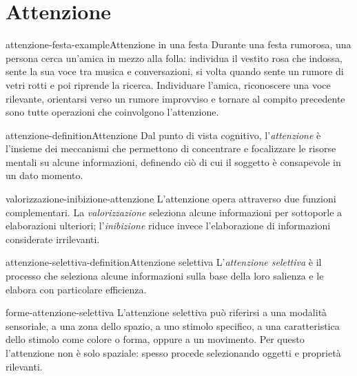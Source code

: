 \documentclass[preview]{standalone}
\begin{document}
\genpage

\section{Attenzione}

\begin{snippetexample}{attenzione-festa-example}{Attenzione in una festa}
    Durante una festa rumorosa, una persona cerca un'amica in mezzo alla folla:
    individua il vestito rosa che indossa, sente la sua voce tra musica e
    conversazioni, si volta quando sente un rumore di vetri rotti e poi riprende
    la ricerca. Individuare l'amica, riconoscere una voce rilevante, orientarsi
    verso un rumore improvviso e tornare al compito precedente sono tutte
    operazioni che coinvolgono l'attenzione.
\end{snippetexample}

\begin{snippetdefinition}{attenzione-definition}{Attenzione}
    Dal punto di vista cognitivo, l'\emph{attenzione} è l'insieme dei meccanismi
    che permettono di concentrare e focalizzare le risorse mentali su alcune
    informazioni, definendo ciò di cui il soggetto è consapevole in un dato
    momento.
\end{snippetdefinition}

\begin{snippet}{valorizzazione-inibizione-attenzione}
    L'attenzione opera attraverso due funzioni complementari. La
    \emph{valorizzazione} seleziona alcune informazioni per sottoporle a
    elaborazioni ulteriori; l'\emph{inibizione} riduce invece l'elaborazione di
    informazioni considerate irrilevanti.
\end{snippet}

\begin{snippetdefinition}{attenzione-selettiva-definition}{Attenzione selettiva}
    L'\emph{attenzione selettiva} è il processo che seleziona alcune
    informazioni sulla base della loro salienza e le elabora con particolare
    efficienza.
\end{snippetdefinition}

\begin{snippet}{forme-attenzione-selettiva}
    L'attenzione selettiva può riferirsi a una modalità sensoriale, a una zona
    dello spazio, a uno stimolo specifico, a una caratteristica dello stimolo
    come colore o forma, oppure a un movimento. Per questo l'attenzione non è
    solo spaziale: spesso procede selezionando oggetti e proprietà rilevanti.
\end{snippet}
\end{document}
